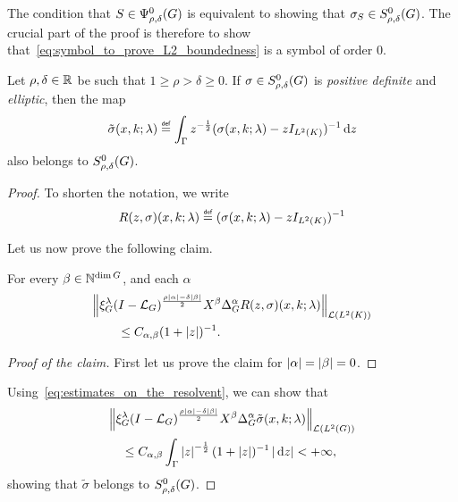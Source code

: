 The condition that $S \in \Psi^{0}_{\rho, \delta}(G)$ is equivalent to showing
that $\sigma_S \in S^{0}_{\rho, \delta}(G)$.
The crucial part of the proof is therefore to show that~\eqref{eq:symbol_to_prove_L2_boundedness} is a symbol of order $0$.

\begin{lemma}
\label{lemma:inverse_of_square_root_of_a_symbol_of_order_zero}
    Let $\rho, \delta \in \mathbb{R}$ be such that $1 \geq \rho > \delta \geq 0$.
    If $\sigma \in S^{0}_{\rho, \delta}(G)$ is \emph{positive definite} and \emph{elliptic},
    then the map
    \begin{align*}
        \tilde \sigma(x, k; \lambda)
        \defeq \int_{\Gamma} z^{-\frac 1 2} (\sigma(x, k; \lambda) - z \Id {\Lebesgue 2 \CompactGroup})^{-1} \dd z
    \end{align*}
    also belongs to $S^{0}_{\rho, \delta}(G)$.
\end{lemma}
\begin{proof}
    To shorten the notation,
    we write
    \begin{align*}
        R(z, \sigma)(x, k; \lambda) \defeq (\sigma(x, k; \lambda) - z \Id {\Lebesgue 2 \CompactGroup})^{-1}
    \end{align*}

    Let us now prove the following claim.

    \begin{claim}
        For every $\beta \in \mathbb{N}^{\dim G}$, and each $\alpha$
        \begin{align}
            &\norm [\Lin {\Lebesgue 2 \CompactGroup}] {\Rep \lambda \BesselPotential {\rho \abs \alpha - \delta \abs \beta} \LeftDifferentialOperator \beta \DifferenceOperatorOrder \alpha R(z, \sigma)(x, k; \lambda)} \notag\\
            &\qquad \leq C_{\alpha, \beta} (1 + \abs z)^{-1}.
            \label{eq:estimates_on_the_resolvent}
        \end{align}
    \end{claim}
    \begin{proof}[Proof of the claim]
        First let us prove the claim for $\left|{\alpha}\right| = \left|{\beta}\right| = 0$.
    \end{proof}

    Using~\eqref{eq:estimates_on_the_resolvent},
    we can show that
    \begin{align*}
        &\norm [\Lin {\Lebesgue 2 \Group}] {\Rep \lambda \BesselPotential {\rho \abs \alpha - \delta \abs \beta} \LeftDifferentialOperator \beta \DifferenceOperatorOrder \alpha \tilde \sigma(x, k; \lambda)}\\
        &\quad \leq C_{\alpha, \beta} \int_\Gamma \abs z^{-\frac 1 2} (1 + \abs z)^{-1} \abs{\dd z} < +\infty,
    \end{align*}
    showing that $\tilde \sigma$ belongs to $S^{0}_{\rho, \delta}(G)$.
\end{proof}

